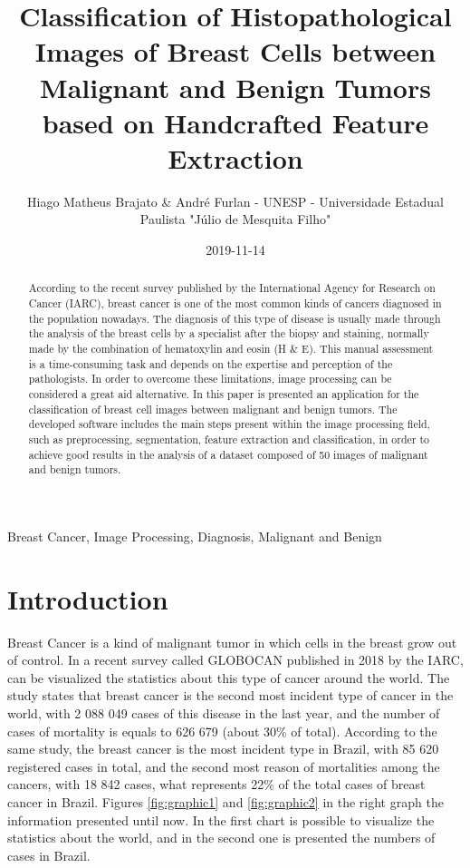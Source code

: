 \documentclass[conference]{IEEEtran}
\begin{document}
	\title{Classification of Histopathological Images of Breast Cells between Malignant and Benign Tumors based on Handcrafted Feature Extraction}
	\author{Hiago Matheus Brajato \& André Furlan - UNESP - Universidade Estadual Paulista "Júlio de Mesquita Filho"}
	\date{2019-11-14}
	\maketitle

	\begin{abstract}
		According to the recent survey published by the International Agency for Research on Cancer (IARC), breast cancer is one of the most common kinds of cancers diagnosed in the population nowadays. The diagnosis of this type of disease is usually made through the analysis of the breast cells by a specialist after the biopsy and staining, normally made by the combination of hematoxylin and eosin (H \& E). This manual assessment is a time-consuming task and depends on the expertise and perception of the pathologists. In order to overcome these limitations, image processing can be considered a great aid alternative. In this paper is presented an application for the classification of breast cell images between malignant and benign tumors. The developed software includes the main steps present within the image processing field, such as preprocessing, segmentation, feature extraction and classification, in order to achieve good results in the analysis of a dataset composed of 50 images of malignant and benign tumors.
	\end{abstract}
	
	\begin{IEEEkeywords}
		Breast Cancer, Image Processing, Diagnosis, Malignant and Benign
	\end{IEEEkeywords}

	\section{Introduction}	
		\par Breast Cancer is a kind of malignant tumor in which cells in the breast grow out of control. In a recent survey called GLOBOCAN \cite{GLOBOCAN} published in 2018 by the IARC, can be visualized the statistics about this type of cancer around the world. The study states that breast cancer is the second most incident type of cancer in the world, with 2 088 049 cases of this disease in the last year, and the number of cases of mortality is equals to 626 679 (about 30\% of total). According to the same study, the breast cancer is the most incident type in Brazil, with 85 620 registered cases in total, and the second most reason of mortalities among the cancers, with 18 842 cases, what represents 22\% of the total cases of breast cancer in Brazil. Figures \ref{fig:graphic1} and \ref{fig:graphic2} in the right graph the information presented until now. In the first chart is possible to visualize the statistics about the world, and in the second one is presented the numbers of cases in Brazil.
		
\end{document}
